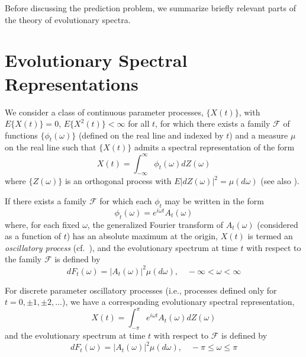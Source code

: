 \documentclass[11pt]{article}
\begin{document}
Before discussing the prediction problem, we summarize briefly relevant parts of the theory of evolutionary spectra.

\section{Evolutionary Spectral Representations}

We consider a class of continuous parameter processes, $\{X(t)\}$, with $E\{X(t)\}=0$, $E\{X^2(t)\}<\infty$ for all $t$, for which there exists a family $\mathscr{F}$ of functions $\{\phi_t(\omega)\}$ (defined on the real line and indexed by $t$) and a measure $\mu$ on the real line such that $\{X(t)\}$ admits a spectral representation of the form
\begin{equation}
X(t) = \int_{-\infty}^{\infty} \phi_t(\omega) dZ(\omega)
\label{eq:evspec-cont}
\end{equation}
where $\{Z(\omega)\}$ is an orthogonal process with $E|dZ(\omega)|^2 = \mu(d\omega)$ (see also \cite{GrangerHatanaka1964}).

If there exists a family $\mathscr{F}$ for which each $\phi_t$ may be written in the form
\begin{equation}
\phi_t(\omega) = e^{i\omega t} A_t(\omega)
\label{eq:phiA}
\end{equation}
where, for each fixed $\omega$, the generalized Fourier transform of $A_t(\omega)$ (considered as a function of $t$) has an absolute maximum at the origin, $X(t)$ is termed an \emph{oscillatory process} (cf.~\cite{Priestley1965}), and the evolutionary spectrum at time $t$ with respect to the family $\mathscr{F}$ is defined by
\begin{equation}
dF_t(\omega) = |A_t(\omega)|^2 \mu(d\omega), \quad -\infty < \omega < \infty
\label{eq:evspec}
\end{equation}

For discrete parameter oscillatory processes (i.e., processes defined only for $t=0, \pm1, \pm2, \ldots$), we have a corresponding evolutionary spectral representation,
\begin{equation}
X(t) = \int_{-\pi}^{\pi} e^{i\omega t} A_t(\omega) dZ(\omega)
\label{eq:evspec-disc}
\end{equation}
and the evolutionary spectrum at time $t$ with respect to $\mathscr{F}$ is defined by
\begin{equation}
dF_t(\omega) = |A_t(\omega)|^2 \mu(d\omega), \quad -\pi \leq \omega \leq \pi
\label{eq:evspec-disc2}
\end{equation}
\end{document}
